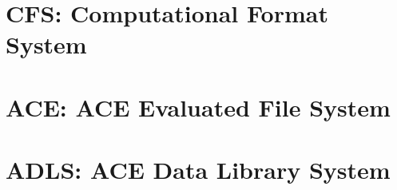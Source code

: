 \documentclass[thesis]{./tex/thesis-umich}
\begin{document}
\chapter{CFS: Computational Format System} \label{chap:cfs}


\chapter{ACE: ACE Evaluated File System} \label{chap:ace}


\chapter{ADLS: ACE Data Library System} \label{chap:adls}


%
%
\end{document}
